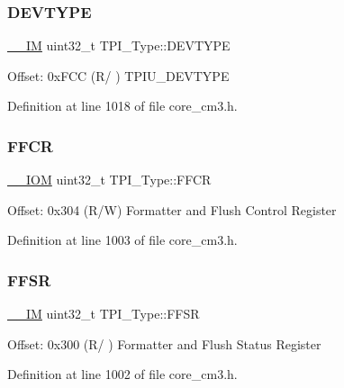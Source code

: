 \subsubsection{\texorpdfstring{D\+E\+V\+T\+Y\+PE}{DEVTYPE}}
{\footnotesize\ttfamily \hyperlink{core__sc300_8h_a4cc1649793116d7c2d8afce7a4ffce43}{\+\_\+\+\_\+\+IM} uint32\+\_\+t T\+P\+I\+\_\+\+Type\+::\+D\+E\+V\+T\+Y\+PE}

Offset\+: 0x\+F\+CC (R/ ) T\+P\+I\+U\+\_\+\+D\+E\+V\+T\+Y\+PE 

Definition at line 1018 of file core\+\_\+cm3.\+h.

\mbox{\label{struct_t_p_i___type_a3f68b6e73561b4849ebf953a894df8d2}} 
\subsubsection{\texorpdfstring{F\+F\+CR}{FFCR}}
{\footnotesize\ttfamily \hyperlink{core__sc300_8h_ab6caba5853a60a17e8e04499b52bf691}{\+\_\+\+\_\+\+I\+OM} uint32\+\_\+t T\+P\+I\+\_\+\+Type\+::\+F\+F\+CR}

Offset\+: 0x304 (R/W) Formatter and Flush Control Register 

Definition at line 1003 of file core\+\_\+cm3.\+h.

\mbox{\label{struct_t_p_i___type_a6c47a0b4c7ffc66093ef993d36bb441c}} 
\subsubsection{\texorpdfstring{F\+F\+SR}{FFSR}}
{\footnotesize\ttfamily \hyperlink{core__sc300_8h_a4cc1649793116d7c2d8afce7a4ffce43}{\+\_\+\+\_\+\+IM} uint32\+\_\+t T\+P\+I\+\_\+\+Type\+::\+F\+F\+SR}

Offset\+: 0x300 (R/ ) Formatter and Flush Status Register 

Definition at line 1002 of file core\+\_\+cm3.\+h.

\mbox{\label{struct_t_p_i___type_aa4d7b5cf39dff9f53bf7f69bc287a814}} 
